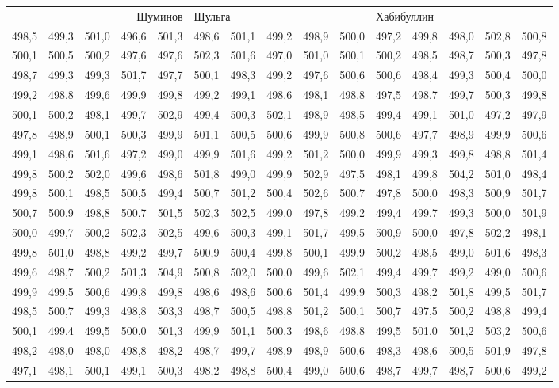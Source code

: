 \small
\begin{longtable}{rrrrr|rrrrr|rrrrr}
\multicolumn{5}{с|}{Шуминов} & \multicolumn{5}{|l|}{Шульга} & \multicolumn{5}{|l}{Хабибуллин} \\
498,5 & 499,3 & 501,0 & 496,6 & 501,3 & 498,6 & 501,1 & 499,2 & 498,9 & 500,0 & 497,2 & 499,8 & 498,0 & 502,8 & 500,8 \\
500,1 & 500,5 & 500,2 & 497,6 & 497,6 & 502,3 & 501,6 & 497,0 & 501,0 & 500,1 & 500,2 & 498,5 & 498,7 & 500,3 & 497,8 \\
498,7 & 499,3 & 499,3 & 501,7 & 497,7 & 500,1 & 498,3 & 499,2 & 497,6 & 500,6 & 500,6 & 498,4 & 499,3 & 500,4 & 500,0 \\
499,2 & 498,8 & 499,6 & 499,9 & 499,8 & 499,2 & 499,1 & 498,6 & 498,1 & 498,8 & 497,5 & 498,7 & 499,7 & 500,3 & 499,8 \\
500,1 & 500,2 & 498,1 & 499,7 & 502,9 & 499,4 & 500,3 & 502,1 & 498,9 & 498,5 & 499,4 & 499,1 & 501,0 & 497,2 & 497,9 \\
497,8 & 498,9 & 500,1 & 500,3 & 499,9 & 501,1 & 500,5 & 500,6 & 499,9 & 500,8 & 500,6 & 497,7 & 498,9 & 499,9 & 500,6 \\
499,1 & 498,6 & 501,6 & 497,2 & 499,0 & 499,9 & 501,6 & 499,2 & 501,2 & 500,0 & 499,9 & 499,3 & 499,8 & 498,8 & 501,4 \\
499,8 & 500,2 & 502,0 & 499,6 & 498,6 & 501,8 & 499,0 & 499,9 & 502,9 & 497,5 & 498,1 & 499,8 & 504,2 & 501,0 & 498,4 \\
499,8 & 500,1 & 498,5 & 500,5 & 499,4 & 500,7 & 501,2 & 500,4 & 502,6 & 500,7 & 497,8 & 500,0 & 498,3 & 500,9 & 501,7 \\
500,7 & 500,9 & 498,8 & 500,7 & 501,5 & 502,3 & 502,5 & 499,0 & 497,8 & 499,2 & 499,4 & 499,7 & 499,3 & 500,0 & 501,9 \\
500,0 & 499,7 & 500,2 & 502,3 & 502,5 & 499,6 & 500,3 & 499,1 & 501,7 & 499,5 & 500,9 & 500,0 & 497,8 & 502,2 & 498,1 \\
499,8 & 501,0 & 498,8 & 499,2 & 499,7 & 500,9 & 500,4 & 499,8 & 500,1 & 499,9 & 500,2 & 498,5 & 499,0 & 501,6 & 498,3 \\
499,6 & 498,7 & 500,2 & 501,3 & 504,9 & 500,8 & 502,0 & 500,0 & 499,6 & 502,1 & 499,4 & 499,7 & 499,2 & 499,0 & 500,6 \\
499,9 & 499,5 & 500,6 & 499,8 & 499,8 & 498,6 & 498,6 & 500,6 & 501,4 & 499,9 & 500,3 & 498,2 & 501,8 & 499,5 & 501,7 \\
498,5 & 500,7 & 499,3 & 498,8 & 503,3 & 498,7 & 500,5 & 498,8 & 501,2 & 500,1 & 500,7 & 497,5 & 500,2 & 498,8 & 499,4 \\
500,1 & 499,4 & 499,5 & 500,0 & 501,3 & 499,9 & 501,1 & 500,3 & 498,6 & 498,8 & 499,5 & 501,0 & 501,2 & 503,2 & 500,6 \\
498,2 & 498,0 & 498,0 & 498,8 & 498,2 & 498,7 & 499,7 & 498,9 & 498,9 & 500,6 & 498,3 & 498,6 & 500,5 & 501,9 & 497,8 \\
497,1 & 498,1 & 500,1 & 499,1 & 500,3 & 498,2 & 498,8 & 500,4 & 499,0 & 500,6 & 498,7 & 499,7 & 498,7 & 500,6 & 499,2 \\
\end{longtable}
    
